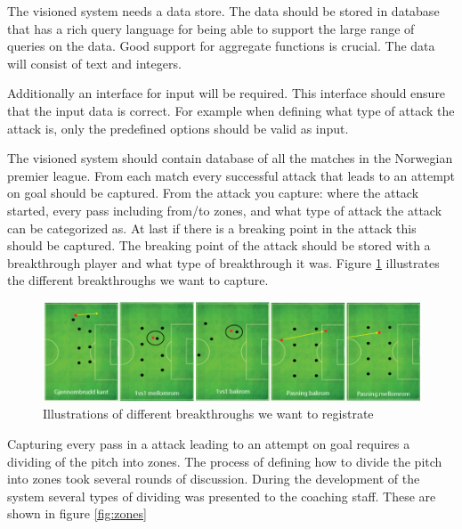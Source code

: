 The visioned system needs a data store. The data should be stored in database that has a rich query language for being able to support the large range of queries on the data. Good support for aggregate functions is crucial. The data will consist of text and integers.

Additionally an interface for input will be required. This interface should ensure that the input data is correct. For example when defining what type of attack the attack is, only the predefined options should be valid as input. 

The visioned system should contain database of all the matches in the Norwegian premier league. From each match every successful attack that leads to an attempt on goal should be captured. From the attack you capture: where the attack started, every pass including from/to zones, and what type of attack the attack can be categorized as. At last if there is a breaking point in the attack this should be captured. The breaking point of the attack should be stored with a breakthrough player and what type of breakthrough it was. Figure \ref{fig:different_break} illustrates the different breakthroughs we want to capture.

\begin{figure}[ht!]
\centering
\includegraphics[width=1\textwidth]{images/general/different_breakthroughs.png}
\caption{Illustrations of different breakthroughs we want to registrate}
\label{fig:different_break}
\end{figure}

Capturing every pass in a attack leading to an attempt on goal requires a dividing of the pitch into zones. The process of defining how to divide the pitch into zones took several rounds of discussion. During the development of the system several types of dividing was presented to the coaching staff. These are shown in figure \ref{fig:zones}

